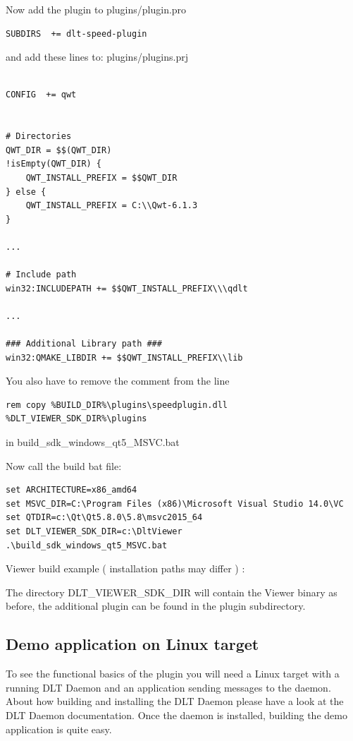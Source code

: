 \documentclass[a4paper,11pt]{article}
\begin{document}
Now add the plugin to plugins/plugin.pro

\begin{verbatim}
SUBDIRS  += dlt-speed-plugin
\end{verbatim}

and add these lines to: plugins/plugins.prj

\begin{verbatim}

CONFIG  += qwt


# Directories
QWT_DIR = $$(QWT_DIR)
!isEmpty(QWT_DIR) {
    QWT_INSTALL_PREFIX = $$QWT_DIR
} else {
    QWT_INSTALL_PREFIX = C:\\Qwt-6.1.3
}

...

# Include path
win32:INCLUDEPATH += $$QWT_INSTALL_PREFIX\\\qdlt

...

### Additional Library path ###
win32:QMAKE_LIBDIR += $$QWT_INSTALL_PREFIX\\lib

\end{verbatim}

You also have to remove the comment from the line
\begin{verbatim}
rem copy %BUILD_DIR%\plugins\speedplugin.dll %DLT_VIEWER_SDK_DIR%\plugins
\end{verbatim}
in build\_sdk\_windows\_qt5\_MSVC.bat

Now call the build bat file:

\begin{verbatim}
set ARCHITECTURE=x86_amd64
set MSVC_DIR=C:\Program Files (x86)\Microsoft Visual Studio 14.0\VC
set QTDIR=c:\Qt\Qt5.8.0\5.8\msvc2015_64
set DLT_VIEWER_SDK_DIR=c:\DltViewer
.\build_sdk_windows_qt5_MSVC.bat
\end{verbatim}


Viewer build example ( installation paths may differ ) :

The directory DLT\_VIEWER\_SDK\_DIR will contain the Viewer binary as before, the additional plugin can be found
in the plugin subdirectory.

\subsection{Demo application on Linux target}
To see the functional basics of the plugin you will need a Linux target with a running DLT Daemon and an application
sending messages to the daemon. About how building and installing the DLT Daemon please have a look at the DLT Daemon documentation.
Once the daemon is installed, building the demo application is quite easy.
\end{document}
